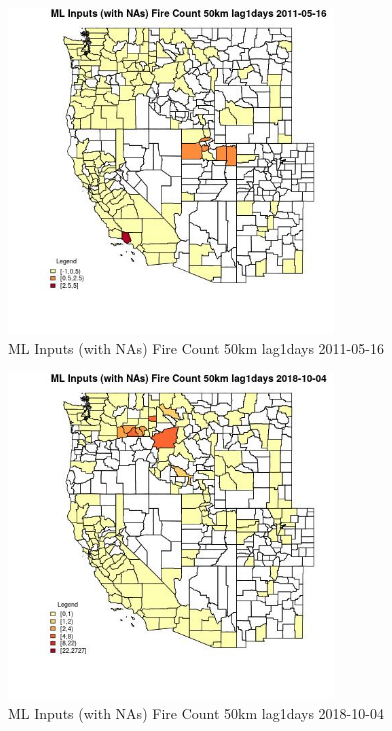 \begin{figure} 
\centering  
\includegraphics[width=0.77\textwidth]{Code_Outputs/Report_ML_input_PM25_Step4_part_f_de_duplicated_aves_prioritize_24hr_obswNAs_CountyFire_Count_50km_lag1daysMean2011-05-16.jpg} 
\caption{\label{fig:Report_ML_input_PM25_Step4_part_f_de_duplicated_aves_prioritize_24hr_obswNAsCountyFire_Count_50km_lag1daysMean2011-05-16}ML Inputs (with NAs) Fire Count 50km lag1days 2011-05-16} 
\end{figure} 
 

\begin{figure} 
\centering  
\includegraphics[width=0.77\textwidth]{Code_Outputs/Report_ML_input_PM25_Step4_part_f_de_duplicated_aves_prioritize_24hr_obswNAs_CountyFire_Count_50km_lag1daysMean2018-10-04.jpg} 
\caption{\label{fig:Report_ML_input_PM25_Step4_part_f_de_duplicated_aves_prioritize_24hr_obswNAsCountyFire_Count_50km_lag1daysMean2018-10-04}ML Inputs (with NAs) Fire Count 50km lag1days 2018-10-04} 
\end{figure} 
 

